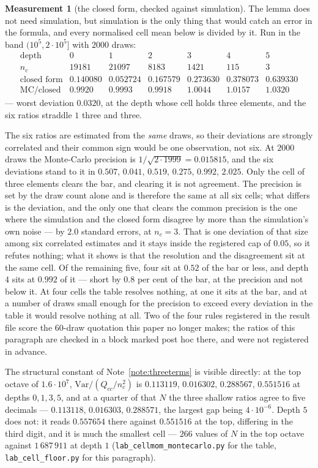 \documentclass[11pt,a4paper]{article}
\theoremstyle{plain}
\theoremstyle{definition}
\newtheorem{measurement}[theorem]{Measurement}
\theoremstyle{remark}
\begin{document}
\begin{measurement}[the closed form, checked against simulation]%
\label{meas:mc}
The lemma does not need simulation, but simulation is the only thing
that would catch an error in the formula, and every normalised cell
mean below is divided by it. Run in the band $(10^5,2\cdot10^5]$ with
$2000$ draws:
\[
\begin{array}{r|cccccc}
 \text{depth} & 0 & 1 & 2 & 3 & 4 & 5\\
 n_c & 19181 & 21097 & 8183 & 1421 & 115 & 3\\\hline
 \text{closed form} & 0.140080 & 0.052724 & 0.167579 & 0.273630
   & 0.378073 & 0.639330\\
 \text{MC}/\text{closed} & 0.9920 & 0.9993
   & 0.9918 & 1.0044 & 1.0157 & 1.0320
\end{array}
\]
--- worst deviation $0.0320$, at the depth whose cell holds three
elements, and the six ratios straddle $1$ three and three.

The six ratios are estimated from the \emph{same} draws, so their
deviations are strongly correlated and their common sign would be one
observation, not six. At $2000$ draws the Monte-Carlo precision is
$1/\sqrt{2\cdot1999}=0.015815$, and the six deviations stand to it
in $0.507,\,0.041,\,0.519,\,0.275,\,0.992,\,2.025$. Only the cell of
three elements clears the bar, and clearing it is not agreement. The
precision is set by the draw count alone and is therefore the same at
all six cells; what differs is the deviation, and the only one that
clears the common precision is the one where the simulation and the
closed form disagree by more than the simulation's own noise --- by
$2.0$ standard errors, at $n_c=3$. That is one deviation
of that size among six correlated estimates and it stays inside the
registered cap of $0.05$, so it refutes nothing; what it shows is that
the resolution and the disagreement sit at the same cell. Of the
remaining five, four sit at $0.52$ of the bar or less, and depth~$4$
sits at $0.992$ of it --- short by $0.8$ per cent of the bar, at the
precision and not below it. At four cells the table resolves nothing,
at one it sits at the bar, and at a number of draws small enough for
the precision to exceed every deviation in the table it would resolve
nothing at all. Two of the four rules
registered in the result file score the $60$-draw quotation this
paper no longer makes; the ratios of this paragraph are checked in a
block marked post hoc there, and were not registered in advance.

The structural constant of Note~\ref{note:threeterms} is visible
directly: at the top octave of $1.6\cdot10^7$,
$\mathrm{Var}/(Q_{cc}/n_c^2)$ is
$0.113119,\,0.016302,\,0.288567,\,0.551516$ at depths $0,1,3,5$, and
at a quarter of that $N$ the three shallow ratios agree to five
decimals --- $0.113118,\,0.016303,\,0.288571$, the largest gap being
$4\cdot10^{-6}$. Depth $5$ does not: it reads
$0.557654$ there against $0.551516$ at the top, differing in the third
digit, and it is much the smallest cell --- $266$ values of $N$ in the
top octave against $1\,687\,911$ at depth $1$
(\texttt{lab\_cellmom\_montecarlo.py} for the table,
\texttt{lab\_cell\_floor.py} for this paragraph).
\end{measurement}
\end{document}
